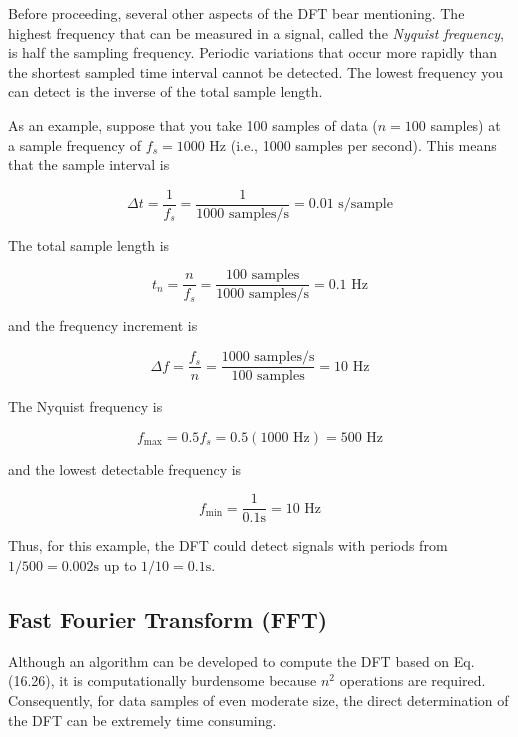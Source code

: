 \documentclass[../main.tex]{subfiles}
\begin{document}
Before proceeding, several other aspects of the DFT bear mentioning. The highest frequency that can be measured in a signal, called the \textit{Nyquist frequency}, is half the sampling
frequency. Periodic variations that occur more rapidly than the shortest sampled time interval cannot be detected. The lowest frequency you can detect is the inverse of the total
sample length.

As an example, suppose that you take 100 samples of data ($n = 100$ samples) at a
sample frequency of $f_s = 1000$ Hz (i.e., 1000 samples per second). This means that the
sample interval is

\begin{equation}
	\Delta t = \frac{1}{f_s}=\frac{1}{1000 \text{ samples/s}} = 0.01 \text{ s/sample}
\end{equation}

\noindent The total sample length is 

\begin{equation}
	t_n = \frac{n}{f_s} = \frac{100 \text{ samples}}{1000 \text{ samples/s}}=0.1 \text{ Hz}
\end{equation}

\noindent and the frequency increment is

\begin{equation}
	\Delta f = \frac{f_s}{n} = \frac{1000 \text{ samples/s}}{100 \text{ samples}}=10 \text{ Hz}
\end{equation}

\noindent The Nyquist frequency is

\begin{equation}
	f_{\text{max}} = 0.5 f_s = 0.5 (1000 \text{ Hz}) = 500 \text{ Hz}
\end{equation}

\noindent and the lowest detectable frequency is

\begin{equation}
	f_{\text{min}} = \frac{1}{0.1 \text{s}} = 10 \text{ Hz}
\end{equation}

\noindent Thus, for this example, the DFT could detect signals with periods from $1/500 = 0.002 \text{s}$ up
to $1/10 = 0.1\text{s}$.

\label{cha:cha_P_16_5_1} %
\subsection{Fast Fourier Transform (FFT)}

\noindent Although an algorithm can be developed to compute the DFT based on Eq. (16.26), it is
computationally burdensome because $n^2$ operations are required. Consequently, for data
samples of even moderate size, the direct determination of the DFT can be extremely time
consuming.
\end{document}
